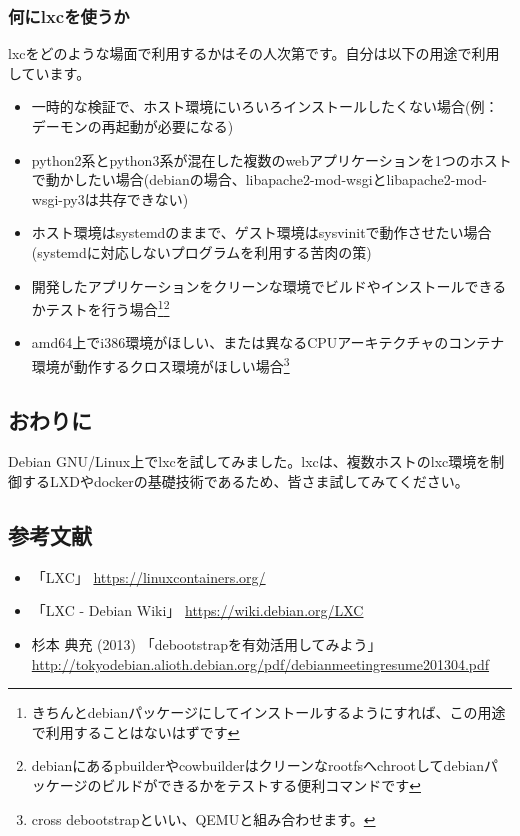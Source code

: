 \documentclass[mingoth,a4paper]{jsarticle}
\begin{document}
\newpage

\subsubsection{何にlxcを使うか}

lxcをどのような場面で利用するかはその人次第です。自分は以下の用途で利用しています。

\begin{itemize}
\item 一時的な検証で、ホスト環境にいろいろインストールしたくない場合(例：デーモンの再起動が必要になる)
\item python2系とpython3系が混在した複数のwebアプリケーションを1つのホストで動かしたい場合(debianの場合、libapache2-mod-wsgiとlibapache2-mod-wsgi-py3は共存できない)
\item ホスト環境はsystemdのままで、ゲスト環境はsysvinitで動作させたい場合(systemdに対応しないプログラムを利用する苦肉の策)
\item 開発したアプリケーションをクリーンな環境でビルドやインストールできるかテストを行う場合\footnote{きちんとdebianパッケージにしてインストールするようにすれば、この用途で利用することはないはずです}\footnote{debianにあるpbuilderやcowbuilderはクリーンなrootfsへchrootしてdebianパッケージのビルドができるかをテストする便利コマンドです}
\item amd64上でi386環境がほしい、または異なるCPUアーキテクチャのコンテナ環境が動作するクロス環境がほしい場合\footnote{cross debootstrapといい、QEMUと組み合わせます。}
\end{itemize}


\subsection{おわりに}

Debian GNU/Linux上でlxcを試してみました。lxcは、複数ホストのlxc環境を制御するLXDやdockerの基礎技術であるため、皆さま試してみてください。


\subsection{参考文献}

\begin{itemize}
  \item 「LXC」 \url{https://linuxcontainers.org/}
  \item 「LXC - Debian Wiki」 \url{https://wiki.debian.org/LXC}
  \item 杉本 典充 (2013) 「debootstrapを有効活用してみよう」 \url{http://tokyodebian.alioth.debian.org/pdf/debianmeetingresume201304.pdf}
\end{itemize}
\end{document}
